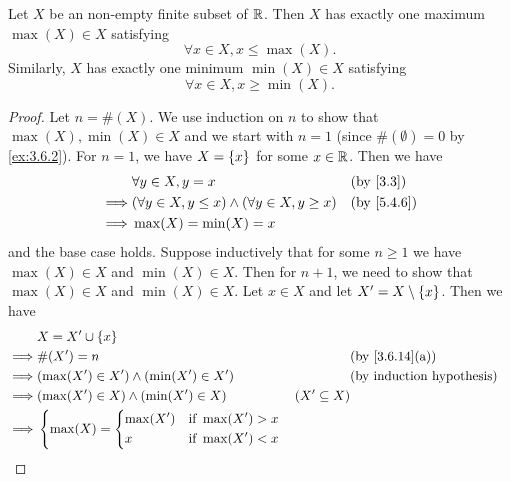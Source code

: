\begin{ac}\label{ac:5.4.1}
  Let \(X\) be an non-empty finite subset of \(\mathbb{R}\).
  Then \(X\) has exactly one maximum \(\max(X) \in X\) satisfying
  \[
    \forall x \in X, x \leq \max(X).
  \]
  Similarly, \(X\) has exactly one minimum \(\min(X) \in X\) satisfying
  \[
    \forall x \in X, x \geq \min(X).
  \]
\end{ac}

\begin{proof}
  Let \(n = \#(X)\).
  We use induction on \(n\) to show that \(\max(X), \min(X) \in X\) and we start with \(n = 1\) (since \(\#(\emptyset) = 0\) by \cref{ex:3.6.2}).
  For \(n = 1\), we have \(X = \left\lbrace x\right\rbrace\) for some \(x \in \mathbb{R}\).
  Then we have
  \begin{align*}
             & \forall y \in X, y = x                                        &  & \text{(by \cref{3.3})} \\
    \implies & (\forall y \in X, y \leq x) \land (\forall y \in X, y \geq x) &  & \by{5.4.6}             \\
    \implies & \max(X) = \min(X) = x
  \end{align*}
  and the base case holds.
  Suppose inductively that for some \(n \geq 1\) we have \(\max(X) \in X\) and \(\min(X) \in X\).
  Then for \(n + 1\), we need to show that \(\max(X) \in X\) and \(\min(X) \in X\).
  Let \(x \in X\) and let \(X' = X \setminus \left\lbrace x\right\rbrace\).
  Then we have
  \begin{align*}
             & X = X' \cup \set{x}                                                                                                                         \\
    \implies & \#(X') = n                                                                                &                  & \text{(by \cref{3.6.14}(a))} \\
    \implies & (\max(X') \in X') \land (\min(X') \in X')                                                 &                  & \byIH                        \\
    \implies & (\max(X') \in X) \land (\min(X') \in X)                                                   & (X' \subseteq X)                                \\
    \implies & \begin{dcases}
                 \max(X) = \begin{dcases}
                  \max(X') & \text{if } \max(X') > x \\
                  x        & \text{if } \max(X') < x

\end{dcases}
\end{dcases}
\end{align*}
\end{proof}
